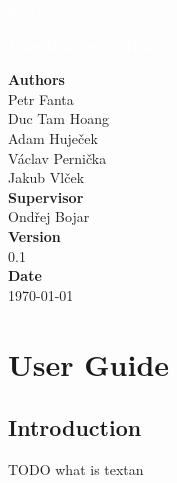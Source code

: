 \documentclass[12pt,a4paper]{report}
\begin{document}
\begin{titlepage}
\BgThispage

\vspace*{0.3\textheight}
\noindent
\textcolor{white}{\bigsf TextAn}

\vspace*{1cm}
\noindent
\textcolor{white}{\Huge\textbf{\textsf{User Documentation}}}

\vspace*{2cm}\par
\noindent
\begin{minipage}{0.35\linewidth}
\textbf{Authors} \\
Petr Fanta \\
Duc Tam Hoang \\
Adam Huječek \\
Václav Pernička \\
Jakub Vlček\vspace{40pt} \\
\textbf{Supervisor} \\
Ondřej Bojar\vspace{40pt} \\
\textbf{Version} \\
0.1\vspace{40pt} \\
\textbf{Date} \\
\today \\
\end{minipage}


\end{titlepage}
\restoregeometry

\tableofcontents



\chapter{User Guide}

\section{Introduction}

TODO what is textan
\end{document}
